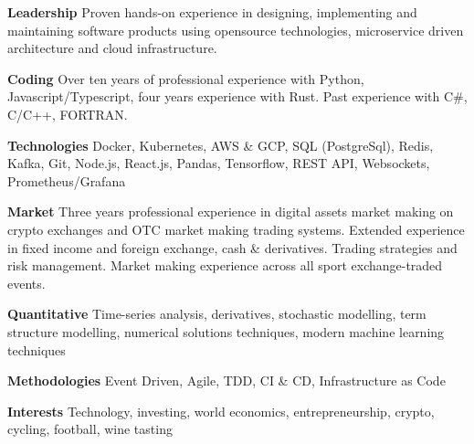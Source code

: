 {\bf Leadership} Proven hands-on experience in designing, implementing and maintaining software products
using opensource technologies, microservice driven architecture and cloud infrastructure.

{\bf Coding} Over ten years of professional experience with Python, Javascript/Typescript, four years experience with Rust.
Past experience with C\#, C/C++, FORTRAN.

{\bf Technologies} Docker, Kubernetes, AWS \& GCP, SQL (PostgreSql), Redis, Kafka, Git, Node.js, React.js, Pandas,
Tensorflow, REST API, Websockets, Prometheus/Grafana

{\bf Market} Three years professional experience in digital assets market making on crypto exchanges and OTC market making trading systems.
Extended experience in fixed income and foreign exchange, cash \& derivatives.
Trading strategies and risk management.
Market making experience across all sport exchange-traded events.

{\bf Quantitative} Time-series analysis, derivatives, stochastic modelling, term structure modelling, numerical solutions techniques, modern machine learning techniques

{\bf Methodologies} Event Driven, Agile, TDD, CI \& CD, Infrastructure as Code

{\bf Interests} Technology, investing, world economics, entrepreneurship, crypto, cycling, football, wine tasting
